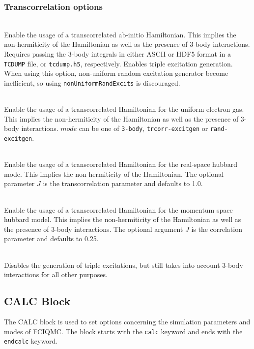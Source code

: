 \documentclass[a4paper,notitlepage,dvipsnames]{scrreprt}
\newcommand\codeitem[1]{\needspace{1.5\baselineskip}\item[\textnormal{\ttfamily #1 \nopagebreak}] \hfill \\ \nopagebreak}
\begin{document}
  \subsubsection{Transcorrelation options}
  \begin{description}
    \codeitem{molecular-transcorr}
    Enable the usage of a transcorrelated ab-initio Hamiltonian. This implies the
    non-hermiticity of the Hamiltonian as well as the presence of 3-body
    interactions. Requires passing the 3-body integrals in either ASCII or
    HDF5 format in a \texttt{TCDUMP} file, or \texttt{tcdump.h5},
    respectively. Enables triple excitation generation. When using this
    option, non-uniform random excitation generator become inefficient, so
    using \texttt{nonUniformRandExcits} is discouraged.
    \codeitem{ueg-transcorr $mode$}
    Enable the usage of a transcorrelated Hamiltonian for the uniform electron
    gas. This implies the non-hermiticity of the Hamiltonian as well as the
    presence of 3-body interactions. $mode$ can be one of \texttt{3-body},
    \texttt{trcorr-excitgen} or \texttt{rand-excitgen}.
    \codeitem{transcorr $J$}
    Enable the usage of a transcorrelated Hamiltonian for the real-space
    hubbard mode. This implies the non-hermiticity of the Hamiltonian. The
    optional parameter $J$ is the transcorrelation parameter and defaults to 1.0.
    \codeitem{2-body-transcorr $J$.}
    Enable the usage of a transcorrelated Hamiltonian for the momentum space
    hubbard model. This implies the non-hermiticity of the Hamiltonian as well as the
    presence of 3-body interactions. The optional argument $J$ is the
    correlation parameter and defaults to 0.25.
    \codeitem{exclude-3-body-ex}
    Disables the generation of triple excitations, but still takes into
    account 3-body interactions for all other purposes.
  \end{description}

  \subsection{CALC Block}
  The CALC block is used to set options concerning the simulation parameters
  and modes of FCIQMC. The block starts with the \texttt{calc} keyword and
  ends with the \texttt{endcalc} keyword.
\end{document}
